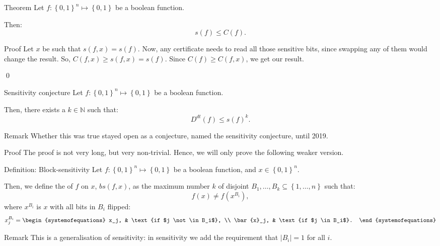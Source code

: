 \documentclass[a4paper]{article}
\begin{document}
\begin{parag}{Theorem}
    Let $f: \left\{0, 1\right\}^n \mapsto \left\{0, 1\right\}$ be a boolean function.

    Then: 
    \[s\left(f\right) \leq C\left(f\right).\]
    
    \begin{subparag}{Proof}
        Let $x$ be such that $s\left(f, x\right) = s\left(f\right)$. Now, any certificate needs to read all those sensitive bits, since swapping any of them would change the result. So, $C\left(f, x\right) \geq s\left(f, x\right) = s\left(f\right)$. Since $C\left(f\right) \geq C\left(f, x\right)$, we get our result.

        \qed
    \end{subparag}
\end{parag}

\begin{parag}{Sensitivity conjecture}
    Let $f: \left\{0, 1\right\}^n \mapsto \left\{0, 1\right\}$ be a boolean function.

    Then, there exists a $k \in \mathbb{N}$ such that: 
    \[D^{dt}\left(f\right) \leq s\left(f\right)^k.\]

    \begin{subparag}{Remark}
        Whether this was true stayed open as a conjecture, named the sensitivity conjecture, until 2019.
    \end{subparag}

    \begin{subparag}{Proof}
        The proof is not very long, but very non-trivial. Hence, we will only prove the following weaker version.
    \end{subparag}
\end{parag}

\begin{parag}{Definition: Block-sensitivity}
    Let $f: \left\{0, 1\right\}^n \mapsto \left\{0, 1\right\}$ be a boolean function, and $x \in \left\{0, 1\right\}^n$.

    Then, we define the  of $f$ on $x$, $bs\left(f, x\right)$, as the maximum number $k$ of disjoint $B_1, \ldots, B_k \subseteq \left\{1, \ldots, n\right\}$ such that: 
    \[f\left(x\right) \neq f\left(x^{B_i}\right),\]
    where $x^{B_i}$ is $x$ with all bits in $B_i$ flipped:
    \[x^{B_i}_j = \begin{systemofequations} x_j, & \text{if $j \not \in B_i$}, \\ \bar{x}_j, & \text{if $j \in B_i$}. \end{systemofequations}\]

    \begin{subparag}{Remark}
        This is a generalisation of sensitivity: in sensitivity we add the requirement that $\left|B_i\right| = 1$ for all $i$.
    \end{subparag}
\end{parag}
\end{document}
